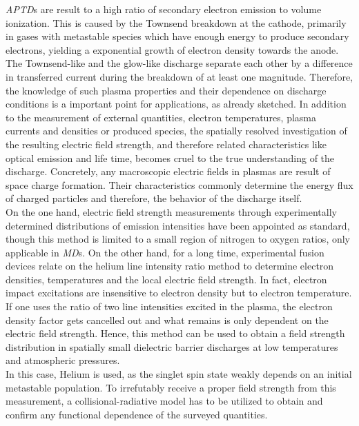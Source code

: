\documentclass[a4paper,10pt,twoside]{article}
\newcommand{\tilt}[1]{\textit{#1}}
\begin{document}
		\tilt{APTD}s are result to a high ratio of secondary electron emission to volume ionization. This is caused by the Townsend breakdown at the cathode, primarily in gases with metastable species which have enough energy to produce secondary electrons, yielding a exponential growth of electron density towards the anode.\\
		The Townsend-like and the glow-like discharge separate each other by a difference in transferred current during the breakdown of at least one magnitude. Therefore, the knowledge of such plasma properties and their dependence on discharge conditions is a important point for applications, as already sketched. In addition to the measurement of external quantities, electron temperatures, plasma currents and densities or produced species, the spatially resolved investigation of the resulting electric field strength, and therefore related characteristics like optical emission and life time, becomes cruel to the true understanding of the discharge. Concretely, any macroscopic electric fields in plasmas are result of space charge formation. Their characteristics commonly determine the energy flux of charged particles and therefore, the behavior of the discharge itself. \\
		On the one hand, electric field strength measurements through experimentally determined distributions of emission intensities have been appointed as standard, though this method is limited to a small region of nitrogen to oxygen ratios, only applicable in \tilt{MD}s. On the other hand, for a long time, experimental fusion devices relate on the helium line intensity ratio method to determine electron densities, temperatures and the local electric field strength. In fact, electron impact excitations are insensitive to electron density but to electron temperature. If one uses the ratio of two line intensities excited in the plasma, the electron density factor gets cancelled out and what remains is only dependent on the electric field strength. Hence, this method can be used to obtain a field strength distribution in spatially small dielectric barrier discharges at low temperatures and atmospheric pressures.\\
		In this case, Helium is used, as the singlet spin state weakly depends on an initial metastable population. To irrefutably receive a proper field strength from this measurement, a collisional-radiative model has to be utilized to obtain and confirm any functional dependence of the surveyed quantities.\\
\end{document}
